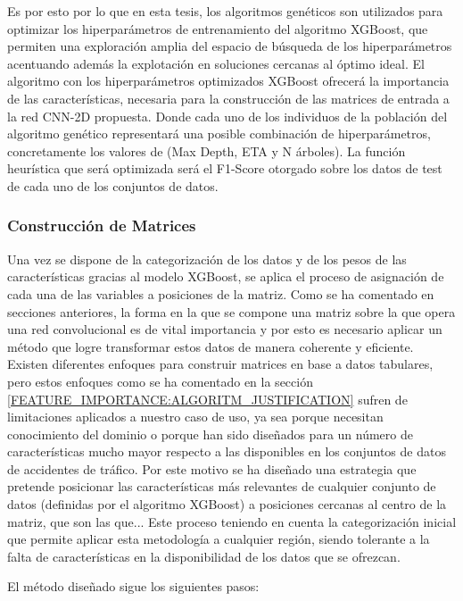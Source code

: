 \documentclass{uathesis-es}
\begin{document}
{	Es por esto por lo que en esta tesis, los algoritmos genéticos son utilizados para optimizar los hiperparámetros de entrenamiento del algoritmo XGBoost, que permiten una exploración amplia del espacio de búsqueda de los hiperparámetros acentuando además la explotación en soluciones cercanas al óptimo ideal. El algoritmo con los hiperparámetros optimizados XGBoost ofrecerá la importancia de las características, necesaria para la construcción de las matrices de entrada a la red CNN-2D propuesta. Donde cada uno de los individuos de la población del algoritmo genético representará una posible combinación de hiperparámetros, concretamente los valores de (Max Depth, ETA y N árboles). La función heurística que será optimizada será el F1-Score otorgado sobre los datos de test de cada uno de los conjuntos de datos.
	
	\subsubsection{Construcción de Matrices}
	
	Una vez se dispone de la categorización de los datos y de los pesos de las características gracias al modelo XGBoost, se aplica el proceso de asignación de cada una de las variables a posiciones de la matriz. Como se ha comentado en secciones anteriores, la forma en la que se compone una matriz sobre la que opera una red convolucional es de vital importancia y por esto es necesario aplicar un método que logre transformar estos datos de manera coherente y eficiente. Existen diferentes enfoques para construir matrices en base a datos tabulares, pero estos enfoques como se ha comentado en la sección \ref{FEATURE_IMPORTANCE:ALGORITM_JUSTIFICATION} sufren de limitaciones aplicados a nuestro caso de uso, ya sea porque necesitan conocimiento del dominio o porque han sido diseñados para un número de características mucho mayor respecto a las disponibles en los conjuntos de datos de accidentes de tráfico. Por este motivo se ha diseñado una estrategia que pretende posicionar las características más relevantes de cualquier conjunto de datos (definidas por el algoritmo XGBoost) a posiciones cercanas al centro de la matriz, que son las que... Este proceso teniendo en cuenta la categorización inicial que permite aplicar esta metodología a cualquier región, siendo tolerante a la falta de características en la disponibilidad de los datos que se ofrezcan.
	
	El método diseñado sigue los siguientes pasos:
	
}
\end{document}
